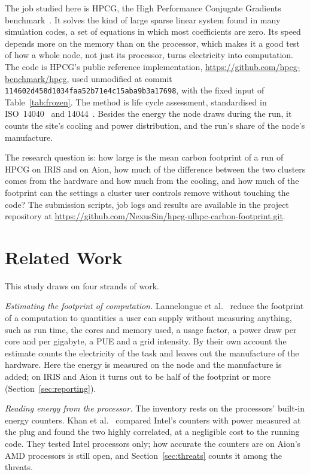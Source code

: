 \documentclass[conference,a4paper]{IEEEtran}
\newcommand{\ProjectRepo}{\url{https://github.com/NexusSin/hpcg-ulhpc-carbon-footprint.git}}
\begin{document}
The job studied here is HPCG, the High Performance Conjugate Gradients
benchmark~\cite{hpcg-repo}. It solves the kind of large sparse linear system found in many
simulation codes, a set of equations in which most coefficients are zero. Its
speed depends more on the memory than on the processor, which makes it a good
test of how a whole node, not just its processor, turns electricity into
computation. The code is HPCG's public reference implementation,
\url{https://github.com/hpcg-benchmark/hpcg}, used unmodified at commit
\texttt{114602d458d1034faa52b71e4c15aba9b3a17698}, with the fixed input of
Table~\ref{tab:frozen}. The method is life cycle assessment, standardised in
ISO~14040~\cite{iso14040} and 14044~\cite{iso14044}. Besides the energy the node draws during the run, it counts the site's
cooling and power distribution, and the run's share of the node's manufacture.

The research question is: how large is the mean carbon footprint of a run of
HPCG on IRIS and on Aion, how much of the difference between the two clusters
comes from the hardware and how much from the cooling, and how much of the
footprint can the settings a cluster user controls remove without touching the
code? The submission scripts, job logs and results are available in the
project repository at \ProjectRepo.

\section{Related Work}

This study draws on four strands of work.

\emph{Estimating the footprint of computation.} Lannelongue et
al.~\cite{lannelongue2021} reduce the footprint of a computation to quantities a
user can supply without measuring anything, such as run time, the cores and
memory used, a usage factor, a power draw per core and per gigabyte, a PUE and a
grid intensity. By their own account the estimate counts the electricity of the
task and leaves out the manufacture of the hardware. Here the energy is measured
on the node and the manufacture is added; on IRIS and Aion it turns out to be
half of the footprint or more (Section~\ref{sec:reporting}).

\emph{Reading energy from the processor.} The inventory rests on the processors'
built-in energy counters. Khan et al.~\cite{khan2018} compared Intel's counters
with power measured at the plug and found the two highly correlated, at a
negligible cost to the running code. They tested Intel processors only; how
accurate the counters are on Aion's AMD processors is still open, and
Section~\ref{sec:threats} counts it among the threats.
\end{document}
